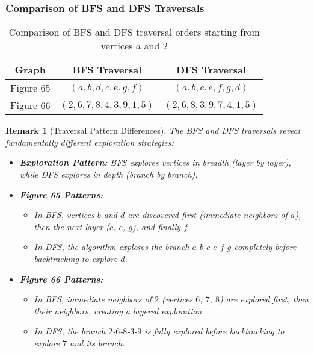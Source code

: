 \documentclass{article}
\newtheorem{remark}{Remark}
\theoremstyle{definition}
\begin{document}
\subsubsection{Comparison of BFS and DFS Traversals}

\begin{table}[h]
\centering
\begin{tabular}{|c|c|c|}
\hline
\textbf{Graph} & \textbf{BFS Traversal} & \textbf{DFS Traversal} \\
\hline
Figure 65 & $(a, b, d, c, e, g, f)$ & $(a, b, c, e, f, g, d)$ \\
\hline
Figure 66 & $(2, 6, 7, 8, 4, 3, 9, 1, 5)$ & $(2, 6, 8, 3, 9, 7, 4, 1, 5)$ \\
\hline
\end{tabular}
\caption{Comparison of BFS and DFS traversal orders starting from vertices $a$ and $2$}
\label{tab:traversal-comparison}
\end{table}

\begin{remark}[Traversal Pattern Differences]
The BFS and DFS traversals reveal fundamentally different exploration strategies:
\begin{itemize}
\item \textbf{Exploration Pattern:} BFS explores vertices in breadth (layer by layer), while DFS explores in depth (branch by branch).

\item \textbf{Figure 65 Patterns:} 
  \begin{itemize}
  \item In BFS, vertices $b$ and $d$ are discovered first (immediate neighbors of $a$), then the next layer ($c$, $e$, $g$), and finally $f$.
  \item In DFS, the algorithm explores the branch $a$-$b$-$c$-$e$-$f$-$g$ completely before backtracking to explore $d$.
  \end{itemize}
  
\item \textbf{Figure 66 Patterns:}
  \begin{itemize}
  \item In BFS, immediate neighbors of $2$ (vertices $6$, $7$, $8$) are explored first, then their neighbors, creating a layered exploration.
  \item In DFS, the branch $2$-$6$-$8$-$3$-$9$ is fully explored before backtracking to explore $7$ and its branch.
  \end{itemize}
\end{itemize}
\end{remark}
\end{document}
